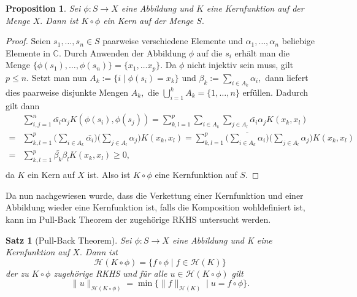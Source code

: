 \documentclass[12pt,titlepage,twoside,cleardoublepage]{article}
\theoremstyle{nummermitklammern}
\newtheorem{satz}[temp]{Satz}
\newtheorem{satz}[zahl]{Satz}
\numberwithin{equation}{section}
\newtheorem{proposition}[zahl]{Proposition}
\begin{document}
\begin{proposition}
Sei $\phi:S \to X $ eine Abbildung und $K$ eine Kernfunktion auf der Menge $X.$ Dann ist $K \circ \phi$ ein Kern auf der Menge $S.$
\end{proposition}
\begin{proof}
Seien $s_1,\ldots,s_n\in S$ paarweise verschiedene Elemente und $\alpha_1,\ldots,\alpha_n$ beliebige Elemente in $\mathbb{C}.$ Durch Anwenden der Abbildung $\phi$ auf die $s_i$ erhält man die Menge $\{\phi(s_1),\ldots,\phi(s_n)\}= \{x_1,\ldots x_p \}.$ Da $\phi$ nicht injektiv sein muss, gilt $p\leq n.$ Setzt man nun $A_k:=\{i \mid \phi(s_i)=x_k\}$ und $\beta_k:= \sum_{i\in A_k}\alpha_i,$ dann liefert dies paarweise disjunkte Mengen $A_k,$ die $\bigcup^k_{i=1} A_k=\{1,\ldots,n\}$ erfüllen. Dadurch gilt dann
\begin{align*}
&\sum_{i,j=1}^n\bar{\alpha_i}\alpha_jK(\phi(s_i),\phi(s_j))
=\sum_{k,l=1}^p\sum_{i\in A_k}\sum_{j\in A_l}\bar{\alpha_i}\alpha_jK(x_k,x_l)\\
=&\sum_{k,l=1}^p\big(\sum_{i\in A_k}\bar{\alpha_i}\big)
\big(\sum_{j\in A_l}\alpha_j \big)K(x_k,x_l)=\sum_{k,l=1}^p\big(\overline{\sum_{i\in A_k}\alpha_i}\big)
\big(\sum_{j\in A_l}\alpha_j \big)K(x_k,x_l)\\
=&\sum_{k,l=1}^p\bar{\beta_k}\beta_lK(x_k,x_l)\geq 0,\\ 
\end{align*}
da $K$ ein Kern auf $X$ ist. Also ist $K\circ \phi$ eine Kernfunktion auf $S$.
\end{proof}
Da nun nachgewiesen wurde, dass die Verkettung einer Kernfunktion und einer Abbildung wieder eine Kernfunktion ist, falls die Komposition wohldefiniert ist, kann im Pull-Back Theorem der zugehörige RKHS untersucht werden.  
\begin{satz}[Pull-Back Theorem]
Sei $\phi:S \to X$ eine Abbildung und K eine Kernfunktion auf $X.$ Dann ist 
\[
\mathcal{H}(K \circ \phi)=\{f\circ \phi \mid f \in \mathcal{H}(K)\}
\] der zu $K\circ \phi$ zugehörige RKHS und für alle $u \in \mathcal{H}(K\circ \phi)$ gilt
\[
\|u\|_{\mathcal{H}(K\circ \phi)}=\min\{\|f\|_{\mathcal{H}(K)}\mid u=f\circ \phi\}.
\]
\end{satz}
\end{document}
